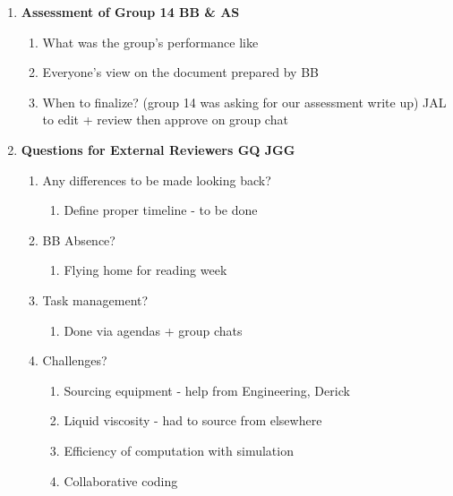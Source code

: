 \begin{enumerate}
\item  \textbf{Assessment of Group 14 BB \& AS}

\begin{enumerate}
\item What was the group's performance like

\item  Everyone's view on the document prepared by BB

\item  When to finalize? (group 14 was asking for our assessment write up) JAL to edit + review then approve on group chat

\end{enumerate}

\item  \textbf{Questions for External Reviewers GQ JGG}

\begin{enumerate}
\item Any differences to be made looking back?

\begin{enumerate}
\item  Define proper timeline - to be done 

\end{enumerate}

\item  BB Absence?

\begin{enumerate}
\item  Flying home for reading week
\end{enumerate}

\item  Task management?

\begin{enumerate}
\item  Done via agendas + group chats
\end{enumerate}

\item  Challenges?

\begin{enumerate}
\item  Sourcing equipment - help from Engineering, Derick

\item  Liquid viscosity - had to source from elsewhere

\item  Efficiency of computation with simulation

\item  Collaborative coding


\end{enumerate}
\end{enumerate}
\end{enumerate}
